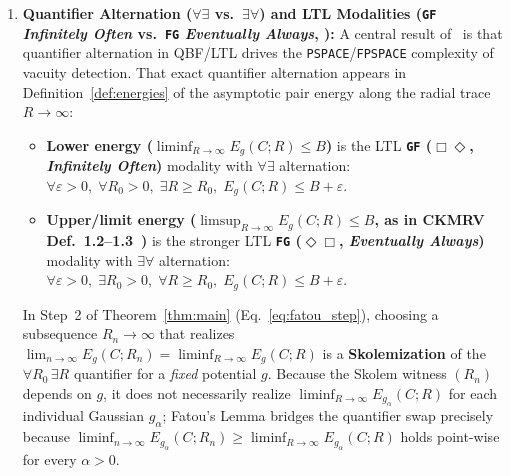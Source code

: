 \documentclass[11pt, a4paper]{article}
\theoremstyle{definition}
\theoremstyle{remark}
\begin{document}
\begin{enumerate}[leftmargin=*, label=\textbf{Failure Mode \arabic*:}]
    \item \textbf{Quantifier Alternation ($\forall\exists$ vs.\ $\exists\forall$) and LTL Modalities (\texttt{GF} \emph{Infinitely Often} vs.\ \texttt{FG} \emph{Eventually Always}, \cite{HHS12}):}
    A central result of~\cite{HHS12} is that quantifier alternation in QBF/LTL drives the \texttt{PSPACE}/\texttt{FPSPACE} complexity of vacuity detection. That exact quantifier alternation appears in Definition~\ref{def:energies} of the asymptotic pair energy along the radial trace $R \to \infty$:
    \begin{itemize}[nosep]
        \item \textbf{Lower energy ($\liminf_{R\to\infty} E_g(C; R) \le B$)} is the LTL \textbf{\texttt{GF} ($\Box\Diamond$, \emph{Infinitely Often})} modality with $\forall\exists$ alternation: $\forall \varepsilon > 0,\; \forall R_0 > 0,\; \exists R \ge R_0,\; E_g(C; R) \le B + \varepsilon$.
        \item \textbf{Upper/limit energy ($\limsup_{R\to\infty} E_g(C; R) \le B$, as in CKMRV Def.~1.2--1.3~\cite{CKMRV22})} is the stronger LTL \textbf{\texttt{FG} ($\Diamond\Box$, \emph{Eventually Always})} modality with $\exists\forall$ alternation: $\forall \varepsilon > 0,\; \exists R_0 > 0,\; \forall R \ge R_0,\; E_g(C; R) \le B + \varepsilon$.
    \end{itemize}
    In Step~2 of Theorem~\ref{thm:main} (Eq.~\eqref{eq:fatou_step}), choosing a subsequence $R_n \to \infty$ that realizes $\lim_{n\to\infty} E_g(C; R_n) = \liminf_{R\to\infty} E_g(C; R)$ is a \textbf{Skolemization} of the $\forall R_0 \, \exists R$ quantifier for a \emph{fixed} potential $g$. Because the Skolem witness $(R_n)$ depends on $g$, it does not necessarily realize $\liminf_{R\to\infty} E_{g_\alpha}(C; R)$ for each individual Gaussian $g_\alpha$; Fatou's Lemma bridges the quantifier swap precisely because $\liminf_{n\to\infty} E_{g_\alpha}(C; R_n) \ge \liminf_{R\to\infty} E_{g_\alpha}(C; R)$ holds point-wise for every $\alpha > 0$.


\end{enumerate}
\end{document}
